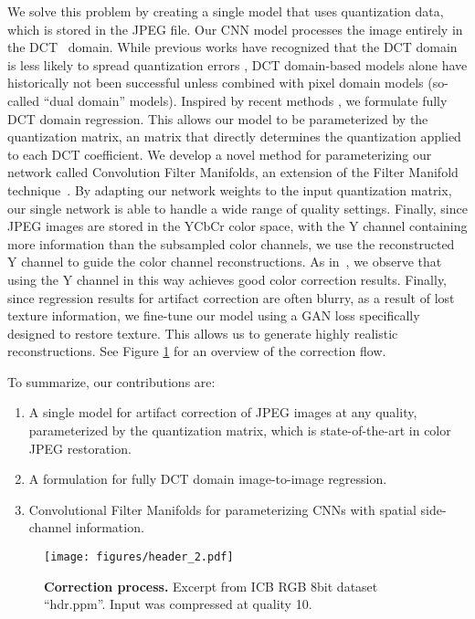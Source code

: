\documentclass[runningheads]{llncs}
\begin{document}
We solve this problem by creating a single model that uses quantization data, which is stored in the JPEG file. Our CNN model processes the image entirely in the DCT~\cite{ahmed1974discrete} domain. While 
previous works have recognized that the DCT domain is less likely to spread quantization errors 
\cite{wang2016d3, zhang2018dmcnn}, DCT domain-based models alone have historically not been successful unless 
combined with pixel domain models (so-called ``dual domain'' models). Inspired by recent methods 
\cite{ehrlich2019deep, deguerre2019fast,dong2015compression,gueguen2018faster}, we formulate fully DCT domain
regression. This allows our model to be parameterized by the quantization matrix, 
an  matrix that directly determines the quantization applied to each DCT coefficient. We develop
a novel method for parameterizing our network called Convolution Filter Manifolds, an 
extension of the Filter Manifold technique~\cite{kang2016crowd}. By adapting our network weights to the input 
quantization matrix, our single network is able to handle a wide range of quality settings. Finally, since JPEG images are stored in
the YCbCr color space, with the Y channel containing more information than the subsampled color channels, we
use the reconstructed Y channel to guide the color channel reconstructions. As in~\cite{zini2019deep}, we observe that using the Y channel in this way achieves good color correction
results. Finally, since regression results for artifact correction are often blurry, as a result of lost
texture information, we fine-tune our model using a GAN loss specifically designed to restore texture. This allows 
us to generate highly realistic reconstructions. See Figure \ref{fig:header} for an overview of the correction flow.
 
To summarize, our contributions are:
\begin{enumerate}
    \item A single model for artifact correction of JPEG images at any quality, parameterized by the 
    quantization matrix, which is state-of-the-art in color JPEG restoration.
    \item A formulation for fully DCT domain image-to-image regression.
    \item Convolutional Filter Manifolds for parameterizing CNNs with spatial side-channel information.
\end{enumerate}

\begin{figure}[t]
    \centering
    \texttt{[image: figures/header\_2.pdf]}
    \caption{\textbf{Correction process.} Excerpt from ICB RGB 8bit dataset ``hdr.ppm''. Input was compressed at quality 10.}
    \label{fig:header}
\end{figure}
 
\end{document}
